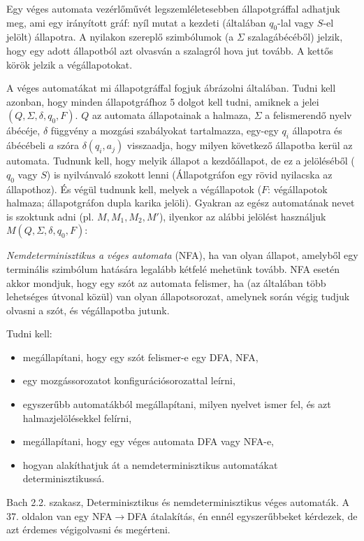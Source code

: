 \documentclass[a4paper]{article}
\begin{document}
Egy véges automata vezérlőművét legszemléletesebben állapotgráffal
adhatjuk meg, ami egy irányított gráf: nyíl mutat a kezdeti (általában
$q_0$-lal vagy $S$-el jelölt) állapotra. A nyilakon szereplő szimbólumok
(a $\Sigma$ szalagábécéből) jelzik, hogy egy adott állapotból azt olvasván a
szalagról hova jut tovább. A kettős körök jelzik a végállapotokat. 

A véges automatákat mi állapotgráffal fogjuk ábrázolni általában. Tudni
kell azonban, hogy minden állapotgráfhoz 5 dolgot kell tudni, amiknek a
jelei $(Q, \Sigma, \delta, q_0, F)$. $Q$ az automata állapotainak a
halmaza, $\Sigma$ a felismerendő nyelv ábécéje, $\delta$ függvény a
mozgási szabályokat tartalmazza, egy-egy $q_i$ állapotra és ábécébeli
$a$ szóra $\delta(q_i, a_j)$ visszaadja, hogy milyen következő állapotba
kerül az automata. Tudnunk kell, hogy melyik állapot a kezdőállapot, de
ez a jelöléséből ($q_0$ vagy $S$) is nyilvánvaló szokott lenni
(Állapotgráfon egy rövid nyilacska az állapothoz). És végül tudnunk
kell, melyek a végállapotok ($F$: végállapotok halmaza; állapotgráfon
dupla karika jelöli).  Gyakran az egész automatának nevet is szoktunk
adni (pl. $M, M_1, M_2, M'$), ilyenkor az alábbi jelölést használjuk
$M(Q, \Sigma, \delta, q_0, F)$: 

\emph{Nemdeterminisztikus a véges automata} (NFA), ha van olyan állapot,
amelyből egy terminális szimbólum hatására legalább kétfelé mehetünk
tovább.  NFA esetén akkor mondjuk, hogy egy szót az automata felismer,
ha (az általában több lehetséges útvonal közül) van olyan
állapotsorozat, amelynek során végig tudjuk olvasni a szót, és
végállapotba jutunk.

Tudni kell:
\begin{itemize}
\item megállapítani, hogy egy szót felismer-e egy DFA, NFA,
\item egy mozgássorozatot konfigurációsorozattal leírni,
\item egyszerűbb automatákból megállapítani, milyen nyelvet ismer fel,
és azt halmazjelölésekkel felírni,
\item megállapítani, hogy egy véges automata DFA vagy NFA-e,
\item hogyan alakíthatjuk át a nemdeterminisztikus automatákat
determinisztikussá.
\end{itemize}

Bach 2.2. szakasz, Determinisztikus és nemdeterminisztikus véges
automaták. A 37. oldalon van egy NFA$\rightarrow$DFA átalakítás, én
ennél egyszerűbbeket kérdezek, de azt érdemes végigolvasni és megérteni.
 
\end{document}
